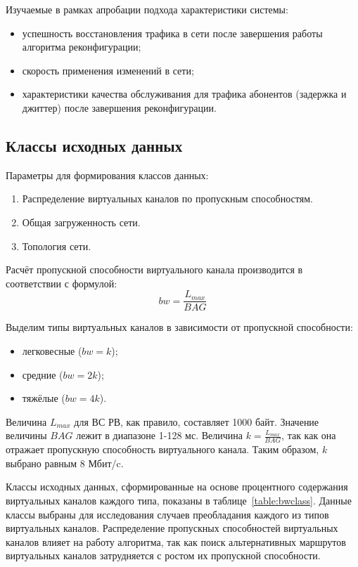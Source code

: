 \documentclass[12pt, a4paper]{article}
\begin{document}
Изучаемые в рамках апробации подхода характеристики системы:
\begin{itemize}
	\item успешность восстановления трафика в сети после завершения работы алгоритма реконфигурации;
	\item скорость применения изменений в сети;
	\item характеристики качества обслуживания для трафика абонентов (задержка и джиттер) после завершения реконфигурации.
\end{itemize}

\subsection{Классы исходных данных}
Параметры для формирования классов данных:
\begin{enumerate}
	\item Распределение виртуальных каналов по пропускным способностям.
	\item Общая загруженность сети.
	\item Топология сети.
\end{enumerate}

Расчёт пропускной способности виртуального канала производится в соответствии с формулой:
$$bw = \frac{L_{max}}{BAG}$$

Выделим типы виртуальных каналов в зависимости от пропускной способности:
\begin{itemize}
	\item легковесные ($bw=k$);
	\item средние ($bw=2k$);
	\item тяжёлые ($bw=4k$).
\end{itemize}

Величина $L_{max}$ для ВС РВ, как правило, составляет 1000 байт. Значение величины ${BAG}$ лежит в диапазоне 1-128 мс. Величина $k = \frac{L_{max}}{BAG}$, так как она отражает пропускную способность виртуального канала. Таким образом, $k$ выбрано равным 8 Мбит/c.

Классы исходных данных, сформированные на основе процентного содержания виртуальных каналов каждого типа, показаны в таблице~\ref{table:bwclass}. Данные классы выбраны для исследования случаев преобладания каждого из типов виртуальных каналов. Распределение пропускных способностей виртуальных каналов влияет на работу алгоритма, так как поиск альтернативных маршрутов виртуальных каналов затрудняется с ростом их пропускной способности.
\end{document}
